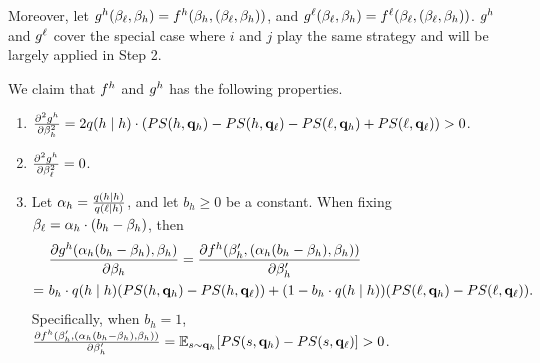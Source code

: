 Moreover, let $g^h(\beta_{\ell}, \beta_{h}) = f^h(\beta_{h}, (\beta_{\ell}, \beta_{h}))$, and $g^\ell(\beta_{\ell}, \beta_{h}) = f^\ell(\beta_{\ell}, (\beta_{\ell}, \beta_{h}))$. $g^h$ and $g^\ell$ cover the special case where $i$ and $j$ play the same strategy and will be largely applied in Step 2. 

\begin{claim}
We claim that $f^h$ and $g^h$ has the following properties. 
    \begin{enumerate}
        \item $\frac{\partial^2g^h}{\partial \beta_{h}^2} = 2q(h\mid h)\cdot (PS(h, \mathbf{q}_h) - PS(h, \mathbf{q}_\ell) - PS(\ell,\mathbf{q}_h) + PS(\ell, \mathbf{q}_\ell)) > 0$. 
        \item $\frac{\partial^2g^h}{\partial \beta_{\ell}^2} = 0$. 
        \item Let $\alpha_h = \frac{q(h\mid h)}{q(\ell \mid h)}$, and let $b_h \ge 0$ be a constant. When fixing $\beta_{\ell} = \alpha_h \cdot (b_h - \beta_{h})$, then 
        \begin{align*}
            &\ \frac{\partial g^h(\alpha_h(b_h - \beta_{h}), \beta_{h})}{\partial \beta_{h}} = \frac{\partial f^h(\beta_{h}', (\alpha_h(b_h - \beta_{h}), \beta_{h}))}{\partial \beta_{h}'}\\ =&\ b_h\cdot q(h\mid h) (PS(h, \mathbf{q}_h) - PS(h, \mathbf{q}_\ell)) + (1 - b_h\cdot q(h\mid h))(PS(\ell, \mathbf{q}_h) - PS(\ell, \mathbf{q}_\ell)). 
        \end{align*}
        Specifically, when $b_h=1$, $\frac{\partial f^h(\beta_{h}', (\alpha_h(b_h - \beta_{h}), \beta_{h}))}{\partial \beta_{h}'} = \mathbb{E}_{s\sim \mathbf{q}_{h}}[PS(s, \mathbf{q}_{h}) - PS(s, \mathbf{q}_{\ell})] > 0$.
    \end{enumerate}
\end{claim}

